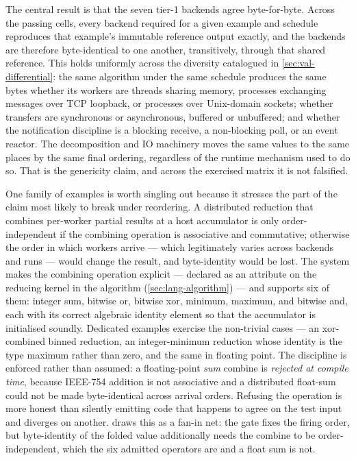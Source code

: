 The central result is that the seven tier-1 backends agree byte-for-byte. Across
the \nmatrixpass{} passing cells, every backend required for a given example and
schedule reproduces that example's immutable reference output exactly, and the
backends are therefore byte-identical to one another, transitively, through that
shared reference. This holds uniformly across the diversity catalogued in
\cref{sec:val-differential}: the same algorithm under the same schedule produces the
same bytes whether its workers are threads sharing memory, processes exchanging
messages over TCP loopback, or processes over Unix-domain sockets; whether transfers
are synchronous or asynchronous, buffered or unbuffered; and whether the
notification discipline is a blocking receive, a non-blocking poll, or an event
reactor. The decomposition and IO machinery moves the same values to the same
places by the same final ordering, regardless of the runtime mechanism used to do
so. That is the genericity claim, and across the exercised matrix it is not
falsified.

One family of examples is worth singling out because it stresses the part of the
claim most likely to break under reordering. A distributed reduction that combines
per-worker partial results at a host accumulator is only order-independent if the
combining operation is associative and commutative; otherwise the order in which
workers arrive --- which legitimately varies across backends and runs --- would
change the result, and byte-identity would be lost. The system makes the combining
operation explicit --- declared as an attribute on the reducing kernel in the
algorithm (\cref{sec:lang-algorithm}) --- and supports six of them: integer sum,
bitwise or, bitwise xor, minimum, maximum, and bitwise and, each with its correct
algebraic identity element so that the accumulator is initialised soundly. Dedicated examples
exercise the non-trivial cases --- an xor-combined binned reduction, an
integer-minimum reduction whose identity is the type maximum rather than zero, and
the same in floating point. The discipline is enforced rather than assumed: a
floating-point \emph{sum} combine is \emph{rejected at compile time}, because
IEEE-754 addition is not associative and a distributed float-sum could not be made
byte-identical across arrival orders. Refusing the operation is more honest than
silently emitting code that happens to agree on the test input and diverges on
another.  draws this as a fan-in net: the gate fixes the
firing order, but byte-identity of the folded value additionally needs the combine
to be order-independent, which the six admitted operators are and a float sum is
not.

